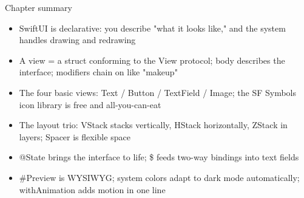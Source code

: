 \begin{tcbsummary}{Chapter summary}
\begin{itemize}
  \item SwiftUI is declarative: you describe "what it looks like," and the system handles drawing and redrawing
  \item A view = a struct conforming to the View protocol; body describes the interface; modifiers chain on like "makeup"
  \item The four basic views: Text / Button / TextField / Image; the SF Symbols icon library is free and all-you-can-eat
  \item The layout trio: VStack stacks vertically, HStack horizontally, ZStack in layers; Spacer is flexible space
  \item @State brings the interface to life; \$ feeds two-way bindings into text fields
  \item \#Preview is WYSIWYG; system colors adapt to dark mode automatically; withAnimation adds motion in one line
\end{itemize}

\end{tcbsummary}
